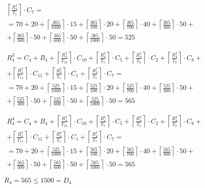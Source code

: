 \begin{gather*}
\begin{multlined}
    \left\lceil\frac{R_4^1}{T_7}\right\rceil\cdot C_7 = \\%
    = 70 + 20 + \left\lceil\frac{365}{1000}\right\rceil\cdot 15 + %
    \left\lceil\frac{365}{100}\right\rceil\cdot 20 + %
    \left\lceil\frac{365}{700}\right\rceil\cdot 40 + %
    \left\lceil\frac{365}{300}\right\rceil\cdot 50 + \\%
    + \left\lceil\frac{365}{300}\right\rceil\cdot 50 + %
    \left\lceil\frac{365}{600}\right\rceil\cdot 50 + %
    \left\lceil\frac{365}{1000}\right\rceil\cdot 50 = 525 \\
  \end{multlined} \\
  \begin{multlined}
    R_4^3 = C_4 + B_4 + \left\lceil\frac{R_4^2}{T_{10}}\right\rceil\cdot C_{10} + %
    \left\lceil\frac{R_4^2}{T_5}\right\rceil\cdot C_5 + %
    \left\lceil\frac{R_4^2}{T_2}\right\rceil\cdot C_2 + %
    \left\lceil\frac{R_4^2}{T_8}\right\rceil\cdot C_8 + \\%
    + \left\lceil\frac{R_4^2}{T_{11}}\right\rceil\cdot C_{11} + %
    \left\lceil\frac{R_4^2}{T_1}\right\rceil\cdot C_1 +%
    \left\lceil\frac{R_4^2}{T_7}\right\rceil\cdot C_7 = \\%
    = 70 + 20 + \left\lceil\frac{525}{1000}\right\rceil\cdot 15 + %
    \left\lceil\frac{525}{100}\right\rceil\cdot 20 + %
    \left\lceil\frac{525}{700}\right\rceil\cdot 40 + %
    \left\lceil\frac{525}{300}\right\rceil\cdot 50 + \\%
    + \left\lceil\frac{525}{300}\right\rceil\cdot 50 + %
    \left\lceil\frac{525}{600}\right\rceil\cdot 50 + %
    \left\lceil\frac{525}{1000}\right\rceil\cdot 50 = 565 \\
  \end{multlined} \\
  \begin{multlined}
    R_4^4 = C_4 + B_4 + \left\lceil\frac{R_4^3}{T_{10}}\right\rceil\cdot C_{10} + %
    \left\lceil\frac{R_4^3}{T_5}\right\rceil\cdot C_5 + %
    \left\lceil\frac{R_4^3}{T_2}\right\rceil\cdot C_2 + %
    \left\lceil\frac{R_4^3}{T_8}\right\rceil\cdot C_8 + \\%
    + \left\lceil\frac{R_4^3}{T_{11}}\right\rceil\cdot C_{11} + %
    \left\lceil\frac{R_4^3}{T_1}\right\rceil\cdot C_1 +%
    \left\lceil\frac{R_4^3}{T_7}\right\rceil\cdot C_7 = \\%
    = 70 + 20 + \left\lceil\frac{525}{1000}\right\rceil\cdot 15 + %
    \left\lceil\frac{565}{100}\right\rceil\cdot 20 + %
    \left\lceil\frac{565}{700}\right\rceil\cdot 40 + %
    \left\lceil\frac{565}{300}\right\rceil\cdot 50 + \\%
    + \left\lceil\frac{565}{300}\right\rceil\cdot 50 + %
    \left\lceil\frac{565}{600}\right\rceil\cdot 50 + %
    \left\lceil\frac{565}{1000}\right\rceil\cdot 50 = 565 \\
  \end{multlined} \\
  R_4 = 565 \le 1500 = D_4
\end{gather*}

